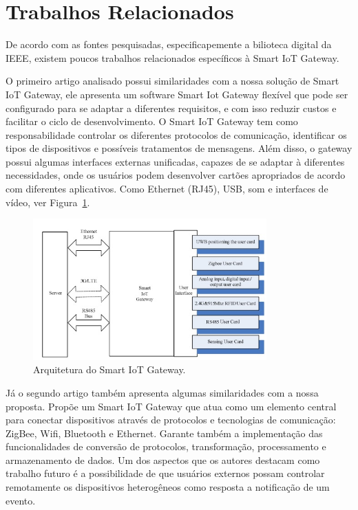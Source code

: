 \section{Trabalhos Relacionados}
\label{sec:trabalhosRelacionados}

De acordo com as fontes pesquisadas, especificapemente a bilioteca digital da IEEE, existem poucos trabalhos relacionados específicos à Smart IoT Gateway. 

O primeiro artigo \cite{designImplementationSIG} analisado possui similaridades com a nossa solução de Smart IoT Gateway, ele apresenta um software Smart Iot Gateway flexível que pode ser configurado para se adaptar a diferentes requisitos, e com isso reduzir custos e facilitar o ciclo de desenvolvimento. O Smart IoT Gateway tem como responsabilidade controlar os diferentes protocolos de comunicação, identificar os tipos de dispositivos e possíveis tratamentos de mensagens. Além disso, o gateway possui algumas interfaces externas unificadas, capazes de se adaptar à diferentes necessidades, onde os usuários podem desenvolver cartões apropriados de acordo com diferentes aplicativos. Como Ethernet (RJ45), USB, som e interfaces de vídeo, ver Figura~\ref{fig:arquiteturaDesignImpelementationSmartIoTGateway}.

\begin{figure}[h!]
	\begin{center}
		\includegraphics[width=0.8\textwidth]{./img/arquiteturaDesignImpelementationSmartIoTGateway}
		\caption{Arquitetura do Smart IoT Gateway. \cite{designImplementationSIG}}
		\label{fig:arquiteturaDesignImpelementationSmartIoTGateway}
	\end{center}
\end{figure}

Já o segundo artigo \cite{smartIotGatewayForHeterogeneous} também apresenta algumas similaridades com a nossa proposta. Propõe um Smart IoT Gateway que atua como um elemento central para conectar dispositivos através de protocolos e tecnologias de comunicação: ZigBee, Wifi, Bluetooth e Ethernet. Garante também a implementação das funcionalidades de conversão de protocolos, transformação, processamento e armazenamento de dados. Um dos aspectos que os autores destacam como trabalho futuro é a possibilidade de que usuários externos possam controlar remotamente os dispositivos heterogêneos como resposta a notificação de um evento.


